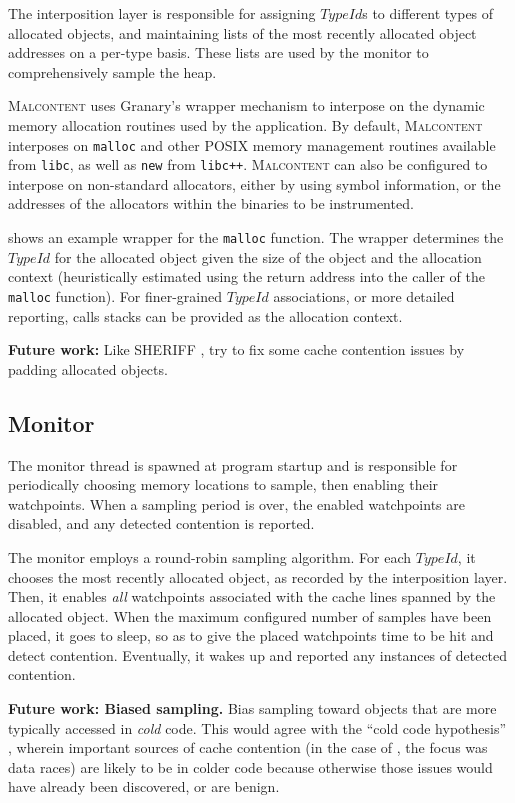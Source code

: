 \documentclass[letterpaper,twocolumn,10pt]{article}
\newcommand{\TextToolname}{Malcontent}
\newcommand{\Toolname}{\textsc{\TextToolname{}}}
\begin{document}
The interposition layer is responsible for assigning $TypeId$s to different types of allocated objects, and maintaining lists of
the most recently allocated object addresses on a per-type basis. These lists are used by the monitor to comprehensively
sample the heap.

\Toolname{} uses Granary's wrapper mechanism \cite{Granary} to interpose on the dynamic memory allocation routines
used by the application. By default, \Toolname{} interposes on \texttt{malloc} and other POSIX memory management
routines  available from \texttt{libc}, as well as \texttt{new} from \texttt{libc++}. \Toolname{} can also be configured to
interpose on non-standard allocators, either by using symbol information, or the addresses of the allocators within the
binaries to be instrumented.

 shows an example wrapper for the \texttt{malloc} function. The wrapper determines the $TypeId$ for the
allocated object given the size of the object and the allocation context (heuristically estimated using the return address into
the caller of the \texttt{malloc} function). For finer-grained $TypeId$ associations, or more detailed reporting, calls stacks
can be provided as the allocation context.

{\bf Future work:} Like SHERIFF \cite{SHERIFF}, try to fix some cache contention issues by padding allocated objects.

\subsection{Monitor}

The monitor thread is spawned at program startup and is responsible for periodically choosing memory locations to sample,
then enabling their watchpoints. When a sampling period is over, the enabled watchpoints are disabled, and any detected
contention is reported.

The monitor employs a round-robin sampling algorithm. For each $TypeId$, it chooses the most recently allocated object, as
recorded by the interposition layer. Then, it enables \emph{all} watchpoints associated with the cache lines spanned by
the allocated object. When the maximum configured number of samples have been placed, it goes to sleep, so as to give the
placed watchpoints time to be hit and detect contention. Eventually, it wakes up and reported any instances of detected
contention.

{\bf Future work: Biased sampling.} Bias sampling toward objects that are more typically accessed in \emph{cold} code.
This would agree with the ``cold code hypothesis'' \cite{LiteRace}, wherein important sources of cache contention (in
the case of \cite{LiteRace}, the focus was data races) are likely to be in colder code because otherwise those issues would
have already been discovered, or are benign.
\end{document}
